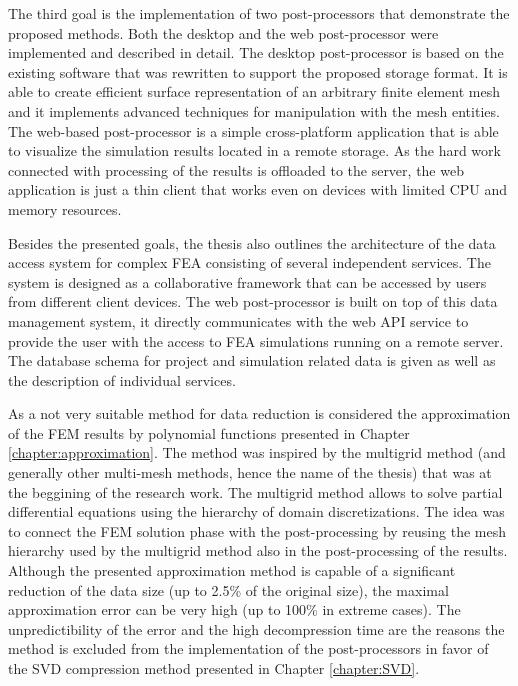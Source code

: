 The third goal is the implementation of two post-processors that demonstrate the proposed methods. Both the desktop and the web post-processor were implemented and described in detail. The desktop post-processor is based on the existing software that was rewritten to support the proposed storage format. It is able to create efficient surface representation of an arbitrary finite element mesh and it implements advanced techniques for manipulation with the mesh entities. The web-based post-processor is a simple cross-platform application that is able to visualize the simulation results located in a remote storage. As the hard work connected with processing of the results is offloaded to the server, the web application is just a thin client that works even on devices with limited CPU and memory resources.

Besides the presented goals, the thesis also outlines the architecture of the data access system for complex FEA consisting of several independent services. The system is designed as a collaborative framework that can be accessed by users from different client devices. The web post-processor is built on top of this data management system, it directly communicates with the web API service to provide the user with the access to FEA simulations running on a remote server. The database schema for project and simulation related data is given as well as the description of individual services.


As a not very suitable method for data reduction is considered the approximation of the FEM results by polynomial functions presented in Chapter \ref{chapter:approximation}. The method was inspired by the multigrid method (and generally other multi-mesh methods, hence the name of the thesis) that was at the beggining of the research work. The multigrid method allows to solve partial differential equations using the hierarchy of domain discretizations. The idea was to connect the FEM solution phase with the post-processing by reusing the mesh hierarchy used by the multigrid method also in the post-processing of the results. Although the presented approximation method is capable of a significant reduction of the data size (up to 2.5\% of the original size), the maximal approximation error can be very high (up to 100\% in extreme cases). The unpredictibility of the error and the high decompression time are the reasons the method is excluded from the implementation of the post-processors in favor of the SVD compression method presented in Chapter \ref{chapter:SVD}.

